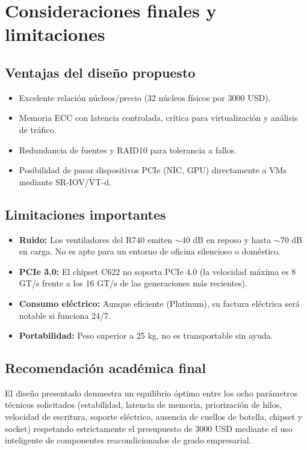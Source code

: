 \documentclass[12pt, letterpaper]{article}
\begin{document}
\section{Consideraciones finales y limitaciones}

\subsection{Ventajas del diseño propuesto}
\begin{itemize}
    \item Excelente relación núcleos/precio (32 núcleos físicos por 3000 USD).
    \item Memoria ECC con latencia controlada, crítica para virtualización y análisis de tráfico.
    \item Redundancia de fuentes y RAID10 para tolerancia a fallos.
    \item Posibilidad de pasar dispositivos PCIe (NIC, GPU) directamente a VMs mediante SR-IOV/VT-d.
\end{itemize}

\subsection{Limitaciones importantes}
\begin{itemize}
    \item \textbf{Ruido:} Los ventiladores del R740 emiten $\sim$40 dB en reposo y hasta $\sim$70 dB en carga. No es apto para un entorno de oficina silencioso o doméstico.
    \item \textbf{PCIe 3.0:} El chipset C622 no soporta PCIe 4.0 (la velocidad máxima es 8 GT/s frente a los 16 GT/s de las generaciones más recientes).
    \item \textbf{Consumo eléctrico:} Aunque eficiente (Platinum), su factura eléctrica será notable si funciona 24/7.
    \item \textbf{Portabilidad:} Peso superior a 25 kg, no es transportable sin ayuda.
\end{itemize}

\subsection{Recomendación académica final}

El diseño presentado demuestra un equilibrio óptimo entre los ocho parámetros técnicos solicitados (estabilidad, latencia de memoria, priorización de hilos, velocidad de escritura, soporte eléctrico, ausencia de cuellos de botella, chipset y socket) respetando estrictamente el presupuesto de 3000 USD mediante el uso inteligente de componentes reacondicionados de grado empresarial.
\end{document}
